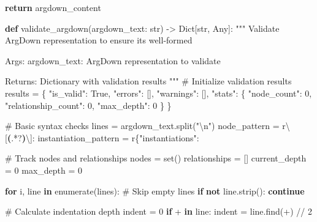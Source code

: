 \documentclass[
  11pt,
  letterpaper,
]{book}
\newenvironment{Shaded}{\begin{snugshade}}{\end{snugshade}}
\newcommand{\BuiltInTok}[1]{\textcolor[rgb]{0.00,0.23,0.31}{#1}}
\newcommand{\CharTok}[1]{\textcolor[rgb]{0.13,0.47,0.30}{#1}}
\newcommand{\CommentTok}[1]{\textcolor[rgb]{0.37,0.37,0.37}{#1}}
\newcommand{\ControlFlowTok}[1]{\textcolor[rgb]{0.00,0.23,0.31}{\textbf{#1}}}
\newcommand{\DecValTok}[1]{\textcolor[rgb]{0.68,0.00,0.00}{#1}}
\newcommand{\KeywordTok}[1]{\textcolor[rgb]{0.00,0.23,0.31}{\textbf{#1}}}
\newcommand{\NormalTok}[1]{\textcolor[rgb]{0.00,0.23,0.31}{#1}}
\newcommand{\OperatorTok}[1]{\textcolor[rgb]{0.37,0.37,0.37}{#1}}
\newcommand{\StringTok}[1]{\textcolor[rgb]{0.13,0.47,0.30}{#1}}
\newcommand{\VariableTok}[1]{\textcolor[rgb]{0.07,0.07,0.07}{#1}}
\newcommand{\VerbatimStringTok}[1]{\textcolor[rgb]{0.13,0.47,0.30}{#1}}
\begin{document}
\begin{Shaded}
\begin{Highlighting}[]
    \ControlFlowTok{return}\NormalTok{ argdown\_content}

\KeywordTok{def}\NormalTok{ validate\_argdown(argdown\_text: }\BuiltInTok{str}\NormalTok{) }\OperatorTok{{-}\textgreater{}}\NormalTok{ Dict[}\BuiltInTok{str}\NormalTok{, Any]:}
    \CommentTok{"""}
\CommentTok{    Validate ArgDown representation to ensure it\textquotesingle{}s well{-}formed}

\CommentTok{    Args:}
\CommentTok{        argdown\_text: ArgDown representation to validate}

\CommentTok{    Returns:}
\CommentTok{        Dictionary with validation results}
\CommentTok{    """}
    \CommentTok{\# Initialize validation results}
\NormalTok{    results }\OperatorTok{=}\NormalTok{ \{}
        \StringTok{"is\_valid"}\NormalTok{: }\VariableTok{True}\NormalTok{,}
        \StringTok{"errors"}\NormalTok{: [],}
        \StringTok{"warnings"}\NormalTok{: [],}
        \StringTok{"stats"}\NormalTok{: \{}
            \StringTok{"node\_count"}\NormalTok{: }\DecValTok{0}\NormalTok{,}
            \StringTok{"relationship\_count"}\NormalTok{: }\DecValTok{0}\NormalTok{,}
            \StringTok{"max\_depth"}\NormalTok{: }\DecValTok{0}
\NormalTok{        \}}
\NormalTok{    \}}

    \CommentTok{\# Basic syntax checks}
\NormalTok{    lines }\OperatorTok{=}\NormalTok{ argdown\_text.split(}\StringTok{"}\CharTok{\textbackslash{}n}\StringTok{"}\NormalTok{)}
\NormalTok{    node\_pattern }\OperatorTok{=} \VerbatimStringTok{r\textquotesingle{}}\CharTok{\textbackslash{}[}\KeywordTok{(}\DecValTok{.}\OperatorTok{*?}\KeywordTok{)}\CharTok{\textbackslash{}]}\VerbatimStringTok{:\textquotesingle{}}
\NormalTok{    instantiation\_pattern }\OperatorTok{=} \VerbatimStringTok{r\textquotesingle{}\{"instantiations":\textquotesingle{}}

    \CommentTok{\# Track nodes and relationships}
\NormalTok{    nodes }\OperatorTok{=} \BuiltInTok{set}\NormalTok{()}
\NormalTok{    relationships }\OperatorTok{=}\NormalTok{ []}
\NormalTok{    current\_depth }\OperatorTok{=} \DecValTok{0}
\NormalTok{    max\_depth }\OperatorTok{=} \DecValTok{0}

    \ControlFlowTok{for}\NormalTok{ i, line }\KeywordTok{in} \BuiltInTok{enumerate}\NormalTok{(lines):}
        \CommentTok{\# Skip empty lines}
        \ControlFlowTok{if} \KeywordTok{not}\NormalTok{ line.strip():}
            \ControlFlowTok{continue}

        \CommentTok{\# Calculate indentation depth}
\NormalTok{        indent }\OperatorTok{=} \DecValTok{0}
        \ControlFlowTok{if} \StringTok{\textquotesingle{}+\textquotesingle{}} \KeywordTok{in}\NormalTok{ line:}
\NormalTok{            indent }\OperatorTok{=}\NormalTok{ line.find(}\StringTok{\textquotesingle{}+\textquotesingle{}}\NormalTok{) }\OperatorTok{//} \DecValTok{2}


\end{Highlighting}
\end{Shaded}
\end{document}
